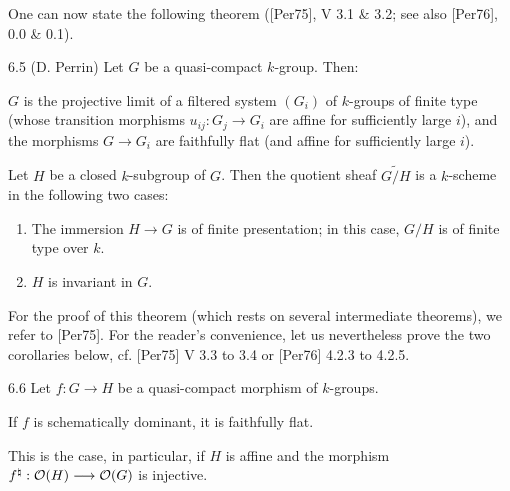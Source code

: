 One can now state the following theorem ([Per75], V 3.1 \& 3.2; see also [Per76], 0.0 \& 0.1).
\begin{theorem}{6.5 (D. Perrin)}\label{VIA.6.5}
Let $G$ be a quasi-compact $k$-group. Then:
\begin{enumeratei}
\item $G$ is the projective limit of a filtered system $(G_i)$ of $k$-groups of finite type (whose transition morphisms $u_{ij}:G_j\to G_i$ are affine for sufficiently large $i$), and the morphisms $G\to G_i$ are faithfully flat (and affine for sufficiently large $i$).
\item Let $H$ be a closed $k$-subgroup of $G$. Then the quotient \fpqc sheaf $\widetilde{G/H}$ is a $k$-scheme in the following two cases:
\begin{enumerate}[label=\textup{(\arabic*)}]
\item The immersion $H\to G$ is of finite presentation; in this case, $G/H$ is of finite type over $k$.
\item $H$ is invariant in $G$.
\end{enumerate}
\end{enumeratei}
\end{theorem}
For the proof of this theorem (which rests on several intermediate theorems), we refer to [Per75]. For the reader's convenience, let us nevertheless prove the two corollaries below, cf. [Per75] V 3.3 to 3.4 or [Per76] 4.2.3 to 4.2.5.
\begin{corollary}{6.6}\label{VIA.6.6}
Let $f:G\to H$ be a quasi-compact morphism of $k$-groups.
\begin{enumeratei}
\item If $f$ is schematically dominant, it is faithfully flat.
\item This is the case, in particular, if $H$ is affine and the morphism $f^\natural:\mathcal{O}(H)\longrightarrow\mathcal{O}(G)$ is injective.
\end{enumeratei}
\end{corollary}

